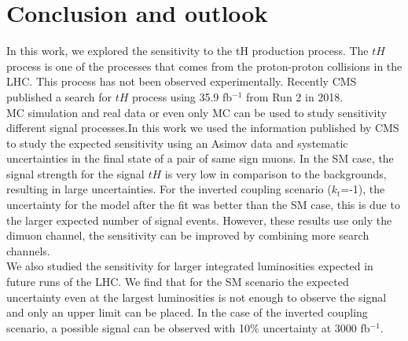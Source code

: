 

\chapter{Conclusion and outlook}
In this work, we explored the sensitivity to the tH production process.
The $tH$ process is one of the processes that comes from the proton-proton collisions in the LHC. This process has not been observed experimentally. Recently CMS published a search for $tH$ process using 35.9 fb$^{-1}$ from Run 2 in 2018. \\

MC simulation and real data or even only MC can be used to study sensitivity different signal processes.In this work we used the information published by CMS to study the expected sensitivity using an Asimov data and systematic uncertainties in the final state of a pair of same sign muons. 
In the SM case, the signal strength for the signal $tH$ is very low in comparison to
the backgrounds, resulting in large uncertainties.
For the inverted coupling scenario ($k_t$=-1), the uncertainty for the model after the fit was better than the
SM case, this is due to the larger expected number of signal events. However, these results use only the dimuon channel, the sensitivity can be improved by combining more search channels.
\\

We also studied the sensitivity for larger integrated luminosities expected in future runs of the LHC. We find that for the SM scenario the expected uncertainty even at the largest luminosities is not enough to observe the signal and only an upper limit can be placed. In the case of the inverted coupling scenario, a possible signal can be observed with 10$\%$ uncertainty at 3000 fb$^{-1}$.\\




